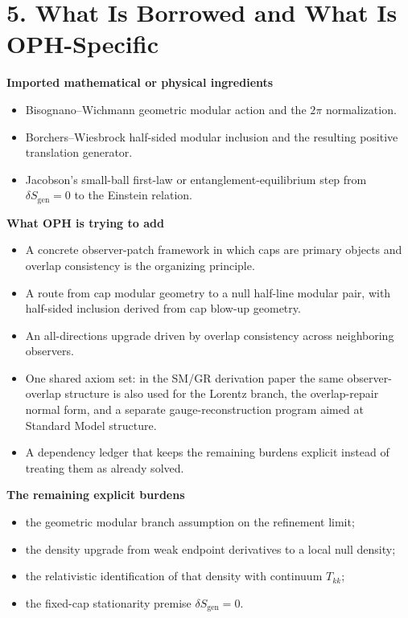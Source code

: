 \documentclass[10pt]{article}
\begin{document}
\section*{5. What Is Borrowed and What Is OPH-Specific}

\textbf{Imported mathematical or physical ingredients}
\begin{itemize}[leftmargin=1.8em]
\item Bisognano--Wichmann geometric modular action and the \(2\pi\) normalization.
\item Borchers--Wiesbrock half-sided modular inclusion and the resulting positive translation generator.
\item Jacobson's small-ball first-law or entanglement-equilibrium step from \(\delta S_{\mathrm{gen}}=0\) to the Einstein relation.
\end{itemize}

\textbf{What OPH is trying to add}
\begin{itemize}[leftmargin=1.8em]
\item A concrete observer-patch framework in which caps are primary objects and overlap consistency is the organizing principle.
\item A route from cap modular geometry to a null half-line modular pair, with half-sided inclusion derived from cap blow-up geometry.
\item An all-directions upgrade driven by overlap consistency across neighboring observers.
\item One shared axiom set: in the SM/GR derivation paper the same observer-overlap structure is also used for the Lorentz branch, the overlap-repair normal form, and a separate gauge-reconstruction program aimed at Standard Model structure.
\item A dependency ledger that keeps the remaining burdens explicit instead of treating them as already solved.
\end{itemize}

\textbf{The remaining explicit burdens}
\begin{itemize}[leftmargin=1.8em]
\item the geometric modular branch assumption on the refinement limit;
\item the density upgrade from weak endpoint derivatives to a local null density;
\item the relativistic identification of that density with continuum \(T_{kk}\);
\item the fixed-cap stationarity premise \(\delta S_{\mathrm{gen}}=0\).
\end{itemize}
\end{document}
